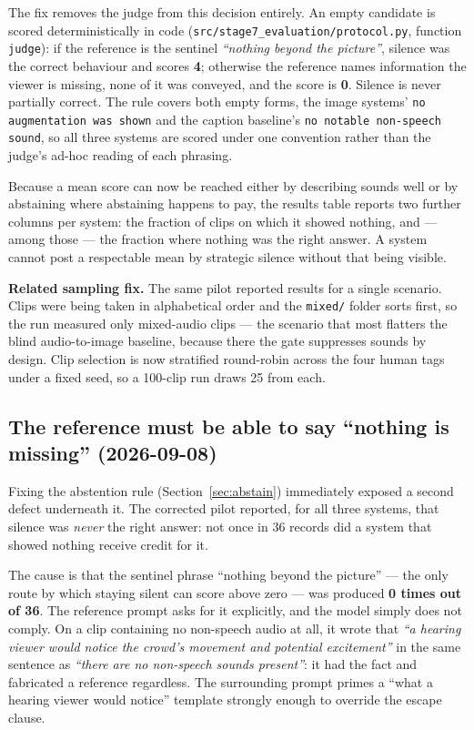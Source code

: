 \documentclass[11pt,a4paper]{article}
\begin{document}
The fix removes the judge from this decision entirely. An empty candidate is scored
deterministically in code (\texttt{src/stage7\_evaluation/protocol.py}, function \texttt{judge}):
if the reference is the sentinel \emph{``nothing beyond the picture''}, silence was the correct
behaviour and scores \textbf{4}; otherwise the reference names information the viewer is missing,
none of it was conveyed, and the score is \textbf{0}. Silence is never partially correct. The rule
covers both empty forms, the image systems' \texttt{no augmentation was shown} and the caption
baseline's \texttt{no notable non-speech sound}, so all three systems are scored under one
convention rather than the judge's ad-hoc reading of each phrasing.

Because a mean score can now be reached either by describing sounds well or by abstaining where
abstaining happens to pay, the results table reports two further columns per system: the fraction of
clips on which it showed nothing, and --- among those --- the fraction where nothing was the right
answer. A system cannot post a respectable mean by strategic silence without that being visible.

\smallskip
\noindent\textbf{Related sampling fix.} The same pilot reported results for a single scenario. Clips
were being taken in alphabetical order and the \texttt{mixed/} folder sorts first, so the run
measured only mixed-audio clips --- the scenario that most flatters the blind audio-to-image
baseline, because there the gate suppresses sounds by design. Clip selection is now stratified
round-robin across the four human tags under a fixed seed, so a 100-clip run draws 25 from each.

\subsection{The reference must be able to say ``nothing is missing'' (2026-09-08)}\label{sec:reference}
Fixing the abstention rule (Section~\ref{sec:abstain}) immediately exposed a second defect underneath
it. The corrected pilot reported, for all three systems, that silence was \emph{never} the right
answer: not once in 36 records did a system that showed nothing receive credit for it.

The cause is that the sentinel phrase ``nothing beyond the picture'' --- the only route by which
staying silent can score above zero --- was produced \textbf{0 times out of 36}. The reference prompt
asks for it explicitly, and the model simply does not comply. On a clip containing no non-speech
audio at all, it wrote that \emph{``a hearing viewer would notice the crowd's movement and potential
excitement''} in the same sentence as \emph{``there are no non-speech sounds present''}: it had the
fact and fabricated a reference regardless. The surrounding prompt primes a ``what a hearing viewer
would notice'' template strongly enough to override the escape clause.
\end{document}
